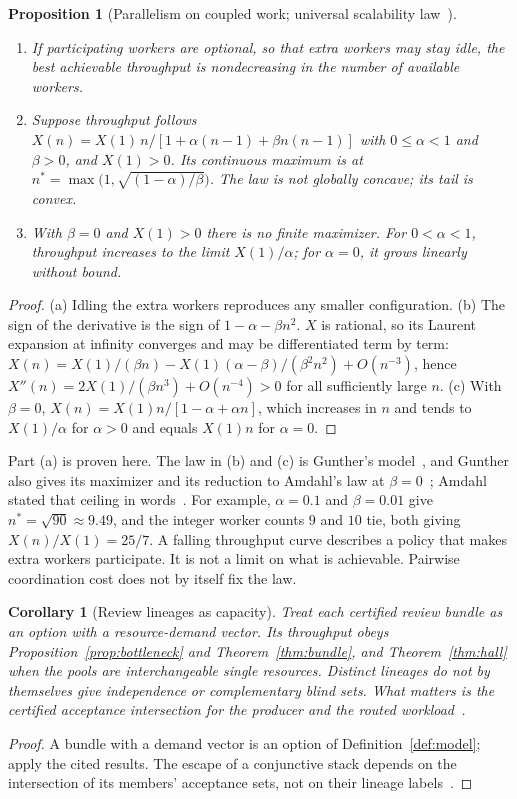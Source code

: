 \documentclass[11pt]{article}
\newtheorem{proposition}[theorem]{Proposition}
\newtheorem{corollary}[theorem]{Corollary}
\theoremstyle{definition}
\theoremstyle{remark}
\begin{document}
\begin{proposition}[Parallelism on coupled work; universal scalability law~\cite{gunther}]\label{prop:usl}
\begin{enumerate}[label=(\alph*),itemsep=2pt]
\item If participating workers are optional, so that extra workers may stay idle, the best achievable
throughput is nondecreasing in the number of available workers.
\item Suppose throughput follows $X(n)=X(1)\,n/[1+\alpha(n-1)+\beta n(n-1)]$ with $0\le\alpha<1$ and
$\beta>0$, and $X(1)>0$. Its continuous maximum is at $n^\ast=\max\big(1,\sqrt{(1-\alpha)/\beta}\big)$. The law
is not globally concave; its tail is convex.
\item With $\beta=0$ and $X(1)>0$ there is no finite maximizer. For $0<\alpha<1$, throughput increases to the limit
$X(1)/\alpha$; for $\alpha=0$, it grows linearly without bound.
\end{enumerate}
\end{proposition}
\begin{proof}
(a) Idling the extra workers reproduces any smaller configuration. (b) The sign of the derivative is
the sign of $1-\alpha-\beta n^2$. $X$ is rational, so its Laurent expansion at infinity converges and may
be differentiated term by term: $X(n)=X(1)/(\beta n)-X(1)(\alpha-\beta)/(\beta^2n^2)+O(n^{-3})$, hence
$X''(n)=2X(1)/(\beta n^3)+O(n^{-4})>0$ for all sufficiently large $n$. (c)
With $\beta=0$, $X(n)=X(1)n/[1-\alpha+\alpha n]$, which increases in $n$ and tends to $X(1)/\alpha$ for
$\alpha>0$ and equals $X(1)n$ for $\alpha=0$.
\end{proof}
Part (a) is proven here. The law in (b) and (c) is Gunther's model~\cite{gunther}, and Gunther also
gives its maximizer and its reduction to Amdahl's law at $\beta=0$~\cite{gunther08}; Amdahl stated
that ceiling in words~\cite{amdahl67}. For example, $\alpha=0.1$ and $\beta=0.01$ give $n^\ast=\sqrt{90}\approx9.49$, and the
integer worker counts $9$ and $10$ tie, both giving $X(n)/X(1)=25/7$. A falling throughput curve describes a policy that makes
extra workers participate. It is not a limit on what is achievable. Pairwise coordination cost does
not by itself fix the law.

\begin{corollary}[Review lineages as capacity]\label{cor:lineages}
Treat each certified review bundle as an option with a resource-demand vector. Its throughput obeys
Proposition~\ref{prop:bottleneck} and Theorem~\ref{thm:bundle}, and Theorem~\ref{thm:hall} when the
pools are interchangeable single resources. Distinct lineages do not by themselves give independence or
complementary blind sets. What matters is the certified acceptance intersection for the producer and
the routed workload~\cite{p6}.
\end{corollary}
\begin{proof}
A bundle with a demand vector is an option of Definition~\ref{def:model}; apply the cited results. The
escape of a conjunctive stack depends on the intersection of its members' acceptance sets, not on
their lineage labels~\cite{p6}.
\end{proof}
\end{document}
